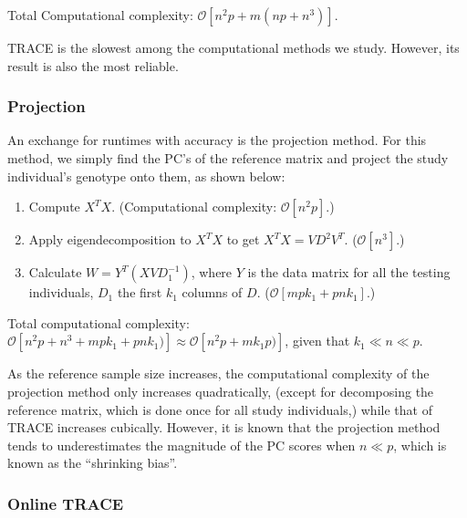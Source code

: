 \documentclass{article}[12pt]
\newcommand{\bO}{\mathcal{O}}
\begin{document}
Total Computational complexity: $\bO[n^2p + m(np + n^3)]$.

TRACE is the slowest among the computational methods we study.
However, its result is also the most reliable.

\subsubsection{Projection}
An exchange for runtimes with accuracy is the projection method.
For this method, we simply find the PC's of the reference matrix and project the study individual's genotype onto them,
as shown below:

\begin{enumerate}
\item Compute $X^T X$.
  (Computational complexity: $\bO[n^2p]$.)  
\item Apply eigendecomposition to $X^T X$ to get $X^T X = V D^2 V^T$.
  ($\bO[n^3]$.)
\item Calculate $W = Y^T (X V D_1^{-1})$, where $Y$ is the data matrix for all the testing individuals, $D_1$ the first $k_1$ columns of $D$. ($\bO[mpk_1 + pnk_1]$.)
\end{enumerate}

Total computational complexity: $\bO[n^2p + n^3 + mpk_1 + pnk_1)] \approx \bO[n^2p + mk_1p)]$,
given that $k_1 \ll n \ll p$.

As the reference sample size increases,
the computational complexity of the projection method only increases quadratically,
(except for decomposing the reference matrix, which is done once for all study individuals,)
while that of TRACE increases cubically.
However, it is known that the projection method tends to underestimates the magnitude of the PC scores when $n \ll p$,
which is known as the ``shrinking bias''.

\subsubsection{Online TRACE}
\end{document}
